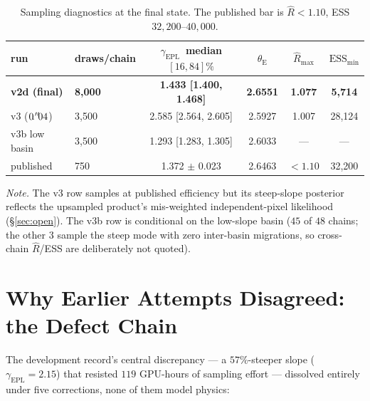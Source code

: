 \documentclass[11pt,letterpaper]{article}
\newcommand{\thetaE}{\ensuremath{\theta_{\mathrm{E}}}}
\newcommand{\gammaEPL}{\ensuremath{\gamma_{\mathrm{EPL}}}}
\begin{document}
\begin{table}[ht]
\centering
\caption{Sampling diagnostics at the final state. The published bar is
$\hat R<1.10$, ESS $32{,}200$--$40{,}000$.}
\label{tab:hmc}
\begin{tabular}{llcccc}
\toprule
run & draws/chain & \gammaEPL\ median $[16,84]\%$ & \thetaE & $\hat R_{\max}$ & $\mathrm{ESS}_{\min}$ \\
\midrule
{\bf v2d (final)} & {\bf 8{,}000} & {\bf 1.433 [1.400, 1.468]} & {\bf 2.6551} & {\bf 1.077} & {\bf 5{,}714} \\
v3 ($0\mbox{$\!\!\,.{}^{\prime\prime}\!\!\,$}04$) & 3{,}500 & 2.585 [2.564, 2.605] & 2.5927 & 1.007 & 28{,}124 \\
v3b low basin & 3{,}500 & 1.293 [1.283, 1.305] & 2.6033 & --- & --- \\
\midrule
published & 750 & 1.372 $\pm$ 0.023 & 2.6463 & $<1.10$ & 32{,}200 \\
\bottomrule
\end{tabular}
\par\smallskip
{\footnotesize\textit{Note.} The v3 row samples at published efficiency
but its steep-slope posterior reflects the upsampled product's
mis-weighted independent-pixel likelihood (\S\ref{sec:open}). The v3b
row is conditional on the low-slope basin ($45$ of $48$ chains; the
other $3$ sample the steep mode with zero inter-basin migrations, so
cross-chain $\hat R$/ESS are deliberately not quoted).}
\end{table}

\section{Why Earlier Attempts Disagreed: the Defect Chain}
\label{sec:defects}

The development record's central discrepancy --- a $57\%$-steeper
slope ($\gammaEPL=2.15$) that resisted $119$ GPU-hours of sampling
effort --- dissolved entirely under five corrections, none of them
model physics:
\end{document}

